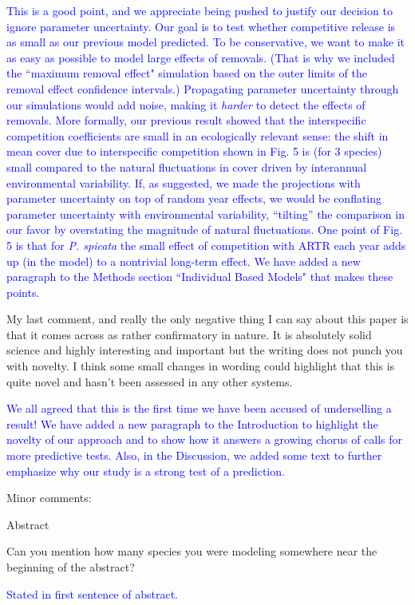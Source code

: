 \documentclass[12pt]{article}
\newcommand{\response}{\textcolor{blue}}
\begin{document}
\response{This is a good point, and we appreciate being pushed to justify our decision to ignore parameter uncertainty. Our goal is to test
whether competitive release is as small as our previous model predicted. To be conservative, we want to make it as easy as possible to
model large effects of removals. (That is why we included the ``maximum removal effect" simulation based on the outer limits of the removal effect
confidence intervals.) Propagating parameter uncertainty through our simulations would add noise, making it \emph{harder} to 
detect the effects of removals. More formally, our previous result showed that the interspecific competition coefficients are small in an ecologically
relevant sense: the shift in mean cover due to interspecific competition shown in Fig. 5 is (for 3 species) small compared to the natural fluctuations in cover driven by interannual environmental variability. If, as suggested, we made the projections with parameter uncertainty on top of random year effects, we would be conflating parameter uncertainty with environmental variability, ``tilting'' the comparison in our favor by overstating the magnitude of natural fluctuations. One point of Fig. 5 is that for \emph{P. spicata} the small effect of competition with ARTR each year adds up (in the model) to a nontrivial long-term effect. We have added a new paragraph to the Methods section ``Individual Based Models" that makes these points. }

 
My last comment, and really the only negative thing I can say about this paper is that it comes across as rather confirmatory in nature. It is absolutely solid science and 
highly interesting and important but the writing does not punch you with novelty. I think some small changes in wording could highlight that this is quite novel and hasn't 
been assessed in any other systems. 

\response{We all agreed that this is the first time we have been accused of underselling a result! We have added a new paragraph to the Introduction
to highlight the novelty of our approach and to show how it answers a growing chorus of calls for more predictive tests. Also, in the Discussion, we 
added some text to further emphasize why our study is a strong test of a prediction. }

Minor comments:

Abstract

Can you mention how many species you were modeling somewhere near the beginning of the abstract?

\response{Stated in first sentence of abstract.}
\end{document}
